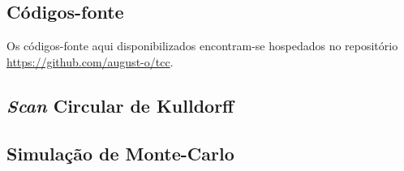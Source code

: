 \documentclass[
	12pt,				%
	openright,			%
	twoside,			%
	a4paper,			%
	english,			%
	brazil,				%
	]{abntex2}
\begin{document}
\postextual



%
%


\begin{apendicesenv}

\partanexos


\chapter{Códigos-fonte}
\label{apen:fonte}

Os códigos-fonte aqui disponibilizados encontram-se  hospedados no repositório \url{https://github.com/august-o/tcc}.


\section{\textit{Scan} Circular de Kulldorff}
\label{anex:scan-circular}



\section{Simulação de Monte-Carlo}


\end{apendicesenv}
\end{document}
